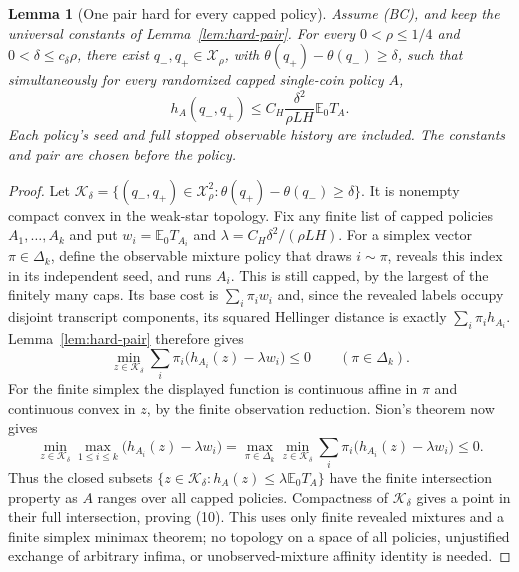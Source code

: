 \documentclass[11pt]{article}
\newtheorem{lemma}[theorem]{Lemma}
\newcommand{\E}{\mathbb E}
\begin{document}
\begin{lemma}[One pair hard for every capped policy]\label{lem:universal-pair}
Assume (BC), and keep the universal constants of
Lemma~\ref{lem:hard-pair}. For every $0<\rho\le1/4$ and
$0<\delta\le c_\delta\rho$, there exist
$q_-,q_+\in\mathcal X_\rho$, with
$\theta(q_+)-\theta(q_-)\ge\delta$, such that simultaneously for every
randomized capped single-coin policy $A$,
\[
 h_A(q_-,q_+)\le C_H\frac{\delta^2}{\rho LH}\E_0T_A.       \tag{10}
\]
Each policy's seed and full stopped observable history are included.
The constants and pair are chosen before the policy.
\end{lemma}
\begin{proof}
Let $\mathcal K_\delta=\{(q_-,q_+)\in\mathcal X_\rho^2:
\theta(q_+)-\theta(q_-)\ge\delta\}$. It is nonempty compact convex in
the weak-star topology. Fix any finite list of capped policies
$A_1,\ldots,A_k$ and put $w_i=\E_0T_{A_i}$ and
$\lambda=C_H\delta^2/(\rho LH)$. For a simplex vector
$\pi\in\Delta_k$, define the observable mixture policy that draws
$i\sim\pi$, reveals this index in its independent seed, and runs $A_i$.
This is still capped, by the largest of the finitely many caps. Its
base cost is $\sum_i\pi_iw_i$ and, since the revealed labels occupy
disjoint transcript components, its squared Hellinger distance is exactly
$\sum_i\pi_i h_{A_i}$. Lemma~\ref{lem:hard-pair} therefore gives
\[
 \min_{z\in\mathcal K_\delta}
       \sum_i\pi_i\big(h_{A_i}(z)-\lambda w_i\big)\le0
       \qquad(\pi\in\Delta_k).
\]
For the finite simplex the displayed function is continuous affine in
$\pi$ and continuous convex in $z$, by the finite observation reduction.
Sion's theorem now gives
\[
 \min_{z\in\mathcal K_\delta}
       \max_{1\le i\le k}\big(h_{A_i}(z)-\lambda w_i\big)
   =\max_{\pi\in\Delta_k}\min_{z\in\mathcal K_\delta}
       \sum_i\pi_i\big(h_{A_i}(z)-\lambda w_i\big)\le0.
\]
Thus the closed subsets
$\{z\in\mathcal K_\delta:h_A(z)\le\lambda\E_0T_A\}$
have the finite intersection property as $A$ ranges over all capped
policies. Compactness of $\mathcal K_\delta$ gives a point in their full
intersection, proving (10). This uses only finite revealed mixtures and
a finite simplex minimax theorem; no topology on a space of all policies,
unjustified exchange of arbitrary infima, or unobserved-mixture affinity
identity is needed.
\end{proof}


\end{document}
